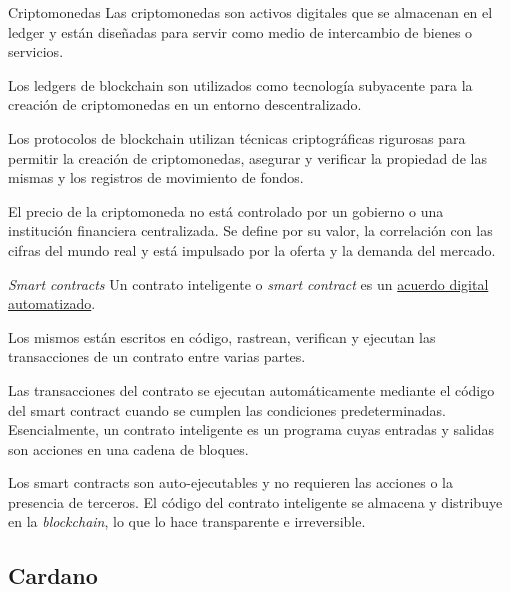 \documentclass{beamer}
\begin{document}
\begin{frame}{Criptomonedas}
Las criptomonedas son activos digitales que se almacenan en el ledger y están diseñadas para servir como medio de intercambio de bienes o servicios. 
\smallskip

\pause

Los ledgers de blockchain son utilizados como tecnología subyacente para la creación de criptomonedas en un entorno descentralizado. 
\smallskip

\pause

Los protocolos de blockchain utilizan técnicas criptográficas rigurosas para permitir la creación de criptomonedas, asegurar y verificar la propiedad de las mismas y los registros de movimiento de fondos. 
\smallskip

\pause

El precio de la criptomoneda no está controlado por un gobierno o una institución financiera centralizada. Se define por su valor, la correlación con las cifras del mundo real y está impulsado por la oferta y la demanda del mercado. 

\end{frame}

\begin{frame}{\textit{Smart contracts}}
    Un contrato inteligente o \textit{smart contract} es un \underline{acuerdo digital automatizado}.
    \smallskip

\pause

    Los mismos están escritos en código, rastrean, verifican y ejecutan las transacciones de un contrato entre varias partes.
    \smallskip

\pause

Las transacciones del contrato se ejecutan automáticamente mediante el código del smart contract cuando se cumplen las condiciones predeterminadas. Esencialmente, un contrato inteligente es un programa cuyas entradas y salidas son acciones en una cadena de bloques.
\smallskip

\pause

Los smart contracts son auto-ejecutables y no requieren las acciones o la presencia de terceros. El código del contrato inteligente se almacena y distribuye en la \textit{blockchain}, lo que lo hace transparente e irreversible.

\end{frame}

\subsection{Cardano}
\end{document}
